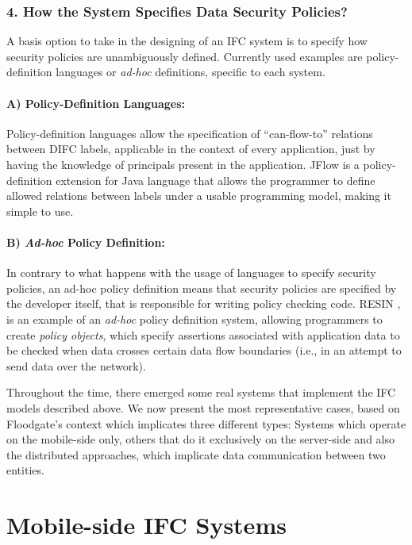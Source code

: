\subsubsection{4. How the System Specifies Data Security Policies?}
A basis option to take in the designing of an IFC system is to specify how security policies are unambiguously defined. Currently used examples are policy-definition languages or \textit{ad-hoc} definitions, specific to each system. 

\paragraph{A) Policy-Definition Languages:}

Policy-definition languages allow the specification of ``can-flow-to'' relations between DIFC labels, applicable in the context of every application, just by having the knowledge of principals present in the application. JFlow \cite{jflow} is a policy-definition extension for Java language that allows the programmer to define allowed relations between labels under a usable programming model, making it simple to use.

\paragraph{B) \textit{Ad-hoc} Policy Definition:}
In contrary to what happens with the usage of languages to specify security policies, an ad-hoc policy definition means that security policies are specified by the developer itself, that is responsible for writing policy checking code. RESIN \cite{resin}, is an example of an \textit{ad-hoc} policy definition system, allowing programmers to create \textit{policy objects}, which specify assertions associated with application data to be checked when data crosses certain data flow boundaries (i.e., in an attempt to send data over the network).

Throughout the time, there emerged some real systems that implement the IFC models described above. We now present the most representative cases, based on Floodgate's context which implicates three different types: Systems which operate on the mobile-side only, others that do it exclusively on the server-side and also the distributed approaches, which implicate data communication between two entities. 

\section{Mobile-side IFC Systems}
\label{sec:mobile-ifc-systems}

